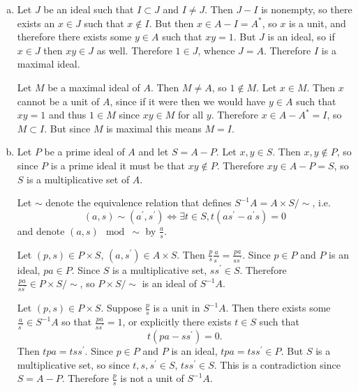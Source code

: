 \documentclass{article}
\begin{document}
\begin{Answer}
  \begin{enumerate}[(a)]
    \item{
      Let $J$ be an ideal such that $I \subset J$ and
      $I \neq J$. Then $J - I$ is nonempty, so there exists an
      $x \in J$ such that $x \notin I$. But then
      $x \in A - I = A^\ast$, so $x$ is a unit, and therefore there
      exists some $y \in A$ such that $xy = 1$. But $J$ is an ideal,
      so if $x \in J$ then $xy \in J$ as well. Therefore $1 \in J$,
      whence $J = A$. Therefore $I$ is a maximal ideal.

      Let $M$ be a maximal ideal of $A$. Then $M \neq A$, so
      $1 \notin M$. Let $x \in M$. Then $x$ cannot be a unit of $A$,
      since if it were then we would have $y \in A$ such that $xy = 1$
      and thus $1 \in M$ since $xy \in M$ for all $y$. Therefore
      $x \in A - A^\ast = I$, so $M \subset I$. But since $M$ is
      maximal this means $M = I$.
    }
    \item{
      Let $P$ be a prime ideal of $A$ and let $S = A - P$. Let
      $x, y \in S$. Then $x, y \notin P$, so since $P$ is a prime
      ideal it must be that $xy \notin P$. Therefore $xy \in A - P =
      S$, so $S$ is a multiplicative set of $A$.

      Let $\sim$ denote the equivalence relation that defines
      $S^{-1} A = A \times S / \sim$, i.e.
      $$
      (a, s) \sim (a^\prime, s^\prime)
      \iff
      \exists t \in S, t(as^\prime - a^\prime s) = 0
      $$
      and denote $(a, s) \mod \sim$ by $\frac{a}{s}$.

      Let $(p, s) \in P \times S$, $(a, s^\prime) \in A \times S$.
      Then $\frac{p}{s} \frac{a}{s^\prime} = \frac{pa}{ss^\prime}$.
      Since $p \in P$ and $P$ is an ideal, $pa \in P$.
      Since $S$ is a multiplicative set, $s s^\prime \in S$. Therefore
      $\frac{pa}{ss^\prime} \in P \times S / \sim$, so
      $P \times S / \sim$ is an ideal of $S^{-1} A$.

      Let $(p, s) \in P \times S$. Suppose
      $\frac{p}{s}$ is a unit in $S^{-1} A$. Then there exists some
      $\frac{a}{s^\prime} \in S^{-1} A$ so that
      $\frac{pa}{ss^\prime} = 1$, or explicitly there exists $t \in S$
      such that
      $$
      t(pa - ss^\prime) = 0.
      $$
      Then $tpa = tss^\prime$. Since $p \in P$ and $P$ is an ideal,
      $tpa = tss^\prime \in P$. But $S$ is a multiplicative set,
      so since $t, s, s^\prime \in S$, $tss^\prime \in S$. This is a
      contradiction since $S = A - P$. Therefore $\frac{p}{s}$ is not a
      unit of $S^{-1} A$.

}
\end{enumerate}
\end{Answer}
\end{document}
